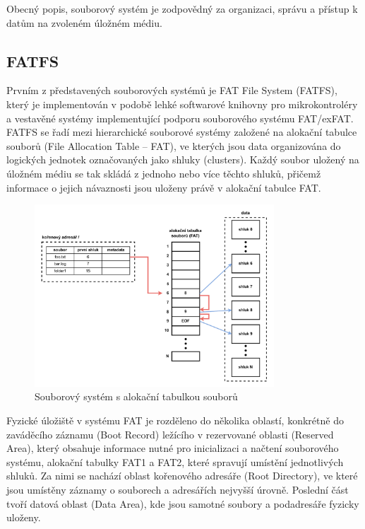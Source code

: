 Obecný popis, souborový systém je zodpovědný za organizaci, správu a přístup k datům na zvoleném úložném médiu.

\subsection{FATFS}
\label{fatfs}
Prvním z představených souborových systémů je FAT File System (FATFS), který je implementován v podobě lehké softwarové knihovny pro mikrokontroléry a vestavěné systémy implementující podporu souborového systému FAT/exFAT. FATFS se řadí mezi hierarchické souborové systémy založené na alokační tabulce souborů (File Allocation Table – FAT), ve kterých jsou data organizována do logických jednotek označovaných jako shluky (clusters). Každý soubor uložený na úložném médiu se tak skládá z jednoho nebo více těchto shluků, přičemž informace o jejich návaznosti jsou uloženy právě v alokační tabulce FAT. \cite{recoverit_fat_filesystem, elm_fat_filesystem_docs}

\begin{figure}[h]
    \centering
    \includegraphics[width=0.80\textwidth]{obrazky-figures/fat_file_system-cz.pdf}
    
    \caption{Souborový systém s alokační tabulkou souborů \cite{recoverit_fat_filesystem}}
    \label{fig:fat-file-system-structure}
\end{figure}

Fyzické úložiště v systému FAT je rozděleno do několika oblastí, konkrétně do zaváděcího záznamu (Boot Record) ležícího v rezervované oblasti (Reserved Area), který obsahuje informace nutné pro inicializaci a načtení souborového systému, alokační tabulky FAT1 a FAT2, které spravují umístění jednotlivých shluků.  Za nimi se nachází oblast kořenového adresáře (Root Directory), ve které jsou umístěny záznamy o souborech a adresářích nejvyšší úrovně. Poslední část tvoří datová oblast (Data Area), kde jsou samotné soubory a podadresáře fyzicky uloženy.

